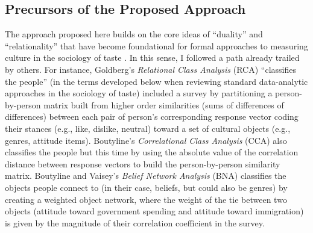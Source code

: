 \documentclass[a4paper,12pt]{extarticle}
\begin{document}
\subsection{Precursors of the Proposed Approach}
The approach proposed here builds on the core ideas of ``duality'' and ``relationality'' that have become foundational for formal approaches to measuring culture in the sociology of taste \citep{mutzel2020duality, mohr2015formal}. In this sense, I followed a path already trailed by others. For instance, Goldberg's \citeyearpar{goldberg2011mapping} {\em Relational Class Analysis} (RCA) ``classifies the people'' (in the terms developed below when reviewing standard data-analytic approaches in the sociology of taste) included a survey by partitioning a person-by-person matrix built from higher order similarities (sums of differences of differences) between each pair of person's corresponding response vector coding their stances (e.g., like, dislike, neutral) toward a set of cultural objects (e.g., genres, attitude items). Boutyline's 
\citeyearpar{boutyline2017improving} {\em Correlational Class Analysis} (CCA) also classifies the people but this time by using the absolute value of the correlation distance between response vectors to build the person-by-person similarity matrix. Boutyline and Vaisey's {\em Belief Network Analysis} (BNA) classifies the objects people connect to (in their case, beliefs, but could also be genres) by creating a weighted object network, where the weight of the tie between two objects (attitude toward government spending and attitude toward immigration) is given by the magnitude of their correlation coefficient in the survey. 
\end{document}
